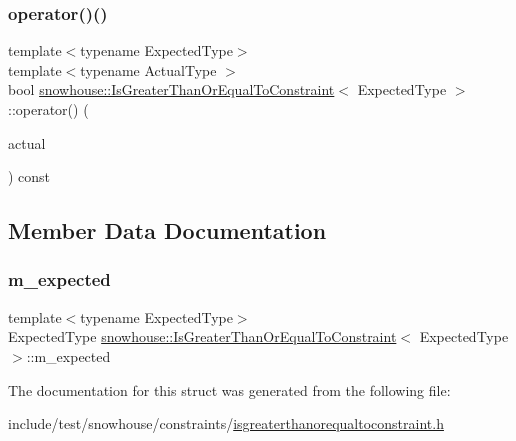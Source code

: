 \subsubsection{\texorpdfstring{operator()()}{operator()()}}
{\footnotesize\ttfamily template$<$typename Expected\+Type$>$ \\
template$<$typename Actual\+Type $>$ \\
bool \mbox{\hyperlink{structsnowhouse_1_1IsGreaterThanOrEqualToConstraint}{snowhouse\+::\+Is\+Greater\+Than\+Or\+Equal\+To\+Constraint}}$<$ Expected\+Type $>$\+::operator() (\begin{DoxyParamCaption}\item[{const Actual\+Type \&}]{actual }\end{DoxyParamCaption}) const\hspace{0.3cm}{\ttfamily [inline]}}



\subsection{Member Data Documentation}
\mbox{\label{structsnowhouse_1_1IsGreaterThanOrEqualToConstraint_a35ca131e554d1b8b06606c98fa7231c0}} 
\subsubsection{\texorpdfstring{m\_expected}{m\_expected}}
{\footnotesize\ttfamily template$<$typename Expected\+Type$>$ \\
Expected\+Type \mbox{\hyperlink{structsnowhouse_1_1IsGreaterThanOrEqualToConstraint}{snowhouse\+::\+Is\+Greater\+Than\+Or\+Equal\+To\+Constraint}}$<$ Expected\+Type $>$\+::m\+\_\+expected}



The documentation for this struct was generated from the following file\+:\begin{DoxyCompactItemize}
\item 
include/test/snowhouse/constraints/\mbox{\hyperlink{isgreaterthanorequaltoconstraint_8h}{isgreaterthanorequaltoconstraint.\+h}}\end{DoxyCompactItemize}
